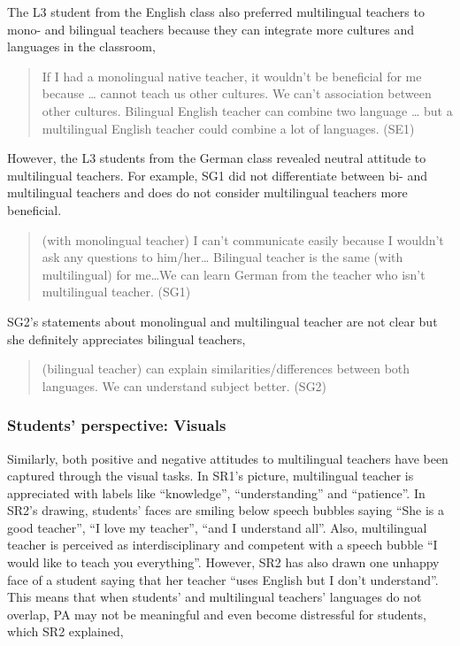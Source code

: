 \documentclass[output=paper]{../langscibook}
\begin{document}
\noindent The L3 student from the English class also preferred multilingual teachers to mono- and bilingual teachers because they can integrate more cultures and languages in the classroom,

\begin{quote}
If I had a monolingual native teacher, it wouldn’t be beneficial for me because … cannot teach us other cultures. We can’t association between other cultures. Bilingual English teacher can combine two language … but a multilingual English teacher could combine a lot of languages. (SE1)
\end{quote}

\noindent However, the L3 students from the German class revealed neutral attitude to multilingual teachers. For example, SG1 did not differentiate between bi- and multilingual teachers and does do not consider multilingual teachers more beneficial. 

\begin{quote}
 (with monolingual teacher) I can't communicate easily because I wouldn't ask any questions to him/her… Bilingual teacher is the same (with multilingual) for me…We can learn German from the teacher who isn’t multilingual teacher. (SG1)
\end{quote}

\noindent SG2’s statements about monolingual and multilingual teacher are not clear but she definitely appreciates bilingual teachers,

\begin{quote}
 (bilingual teacher) can explain similarities/differences between both languages. We can understand subject better. (SG2)
\end{quote}


\subsubsection{Students’ perspective: Visuals}


Similarly, both positive and negative attitudes to multilingual teachers have been captured through the visual tasks. In SR1’s picture, multilingual teacher is appreciated with labels like “knowledge”, “understanding” and “patience”. In SR2’s drawing, students’ faces are smiling below speech bubbles saying “She is a good teacher”, “I love my teacher”, “and I understand all”. Also, multilingual teacher is perceived as interdisciplinary and competent with a speech bubble “I would like to teach you everything”. However, SR2 has also drawn one unhappy face of a student saying that her teacher “uses English but I don’t understand”. This means that when students’ and multilingual teachers’ languages do not overlap, PA may not be meaningful and even become distressful for students, which SR2 explained, 
\end{document}
